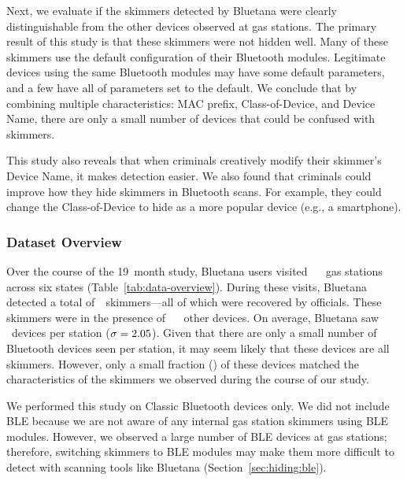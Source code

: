Next, we evaluate if 
the skimmers detected by Bluetana were clearly distinguishable from the other devices observed at gas stations. 
%
% 
The primary result of this study is that these skimmers were not
hidden well.
%
Many of these skimmers use the default configuration of their Bluetooth
modules.
%
Legitimate devices using the same Bluetooth modules may have some default parameters, and a few have all of parameters set to the default.
%
We conclude that by combining multiple characteristics: MAC prefix, Class-of-Device,
and Device Name, there are only a small number of devices that could be
confused with skimmers.

This study also reveals that when criminals creatively modify their skimmer's
Device Name, it makes detection easier.
%
We also found that criminals could improve how they hide skimmers in Bluetooth
scans.
%
For example, they could change the Class-of-Device to hide as a more popular
device (e.g., a smartphone).

\subsubsection*{Dataset Overview} %

Over the course of the 19~month study, Bluetana users visited ~\visitedgasstations~ gas
stations across six states (Table~\ref{tab:data-overview}).
%
During these visits, Bluetana detected a total of~\totalskimmers~skimmers---all of which were recovered by officials.
%
These skimmers were in the presence of ~\totalbtobserved~ other devices.
% 
On average, Bluetana saw \averageclassicBTperstation~devices per
station ($\sigma = 2.05$).
%
Given that there are only a small number of Bluetooth devices seen per station,
it may seem likely that these devices are all skimmers.
%
However, only a small fraction (\pctmatchskimmer) of these devices matched the
characteristics of the skimmers we observed during the course of our study. 
%

%
We performed this study on Classic Bluetooth devices only.
%
We did not include BLE because we are not
aware of any internal gas station skimmers using BLE modules.
%
However, we observed a large number of BLE devices at gas stations; therefore, switching skimmers to
BLE modules may make them more difficult to detect with
scanning tools like Bluetana (Section~\ref{sec:hiding:ble}).


